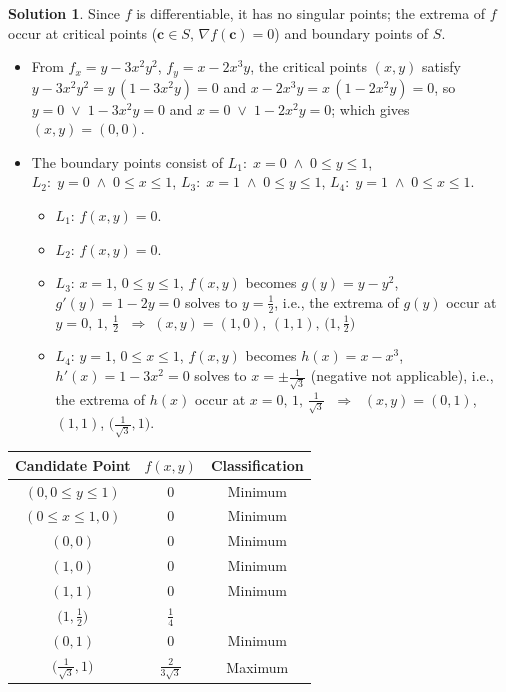 \documentclass[10pt]{extarticle}
\newcommand{\ds}{\displaystyle}
\newcommand{\ie}{\;\Longrightarrow\;}
\newcommand{\orr}{\;\vee\;}
\newcommand{\andd}{\;\wedge\;}
\theoremstyle{definition}
\newtheorem*{sol}{Solution}
\newcommand{\vc}{\mathbf{c}}
\begin{document}
\begin{sol}
  Since $f$ is differentiable, it has no singular points; the extrema of $f$ occur at critical points ($\vc\in S,\,\nabla f(\vc) = 0$) and boundary points of $S$. 
  \begin{itemize}%
    \item From $\ds f_x = y - 3x^2y^2$, $\ds f_y = x - 2x^3y$, the critical points $(x, y)$ satisfy $\ds y - 3x^2y^2 = y\,(1 - 3x^2y) = 0$ and $\ds x - 2x^3y = x\,(1 - 2x^2y)= 0$, so $y = 0\orr 1 - 3x^2y = 0$ and $x = 0\orr 1 - 2x^2y = 0$; which gives $(x, y) = (0, 0)$. 
    \item The boundary points consist of $L_1:\;x = 0\andd 0\leqslant y\leqslant 1$, $L_2:\;y = 0\andd 0\leqslant x\leqslant 1$, $L_3:\;x = 1\andd 0\leqslant y\leqslant 1$, $L_4:\;y = 1\andd 0\leqslant x\leqslant 1$. 
      \begin{itemize}%
        \item $L_1$: $f(x, y) = 0$. 
        \item $L_2$: $f(x, y) = 0$. 
        \item $L_3$: $x = 1$, $0\leqslant y\leqslant1$, $f(x, y)$ becomes $g(y) = y - y^2$, $g'(y) = 1 - 2y = 0$ solves to $y = \frac{1}{2}$, i.e., the extrema of $g(y)$ occur at $y = 0,\,1,\,\frac{1}{2}$ $\ie (x, y) = (1, 0),\,(1, 1),\,\big(1, \frac{1}{2}\big)$ 
        \item $L_4$: $y = 1$, $0\leqslant x\leqslant1$, $f(x, y)$ becomes $h(x) = x - x^3$, $h'(x) = 1 - 3x^2 = 0$ solves to $x = \pm\frac{1}{\sqrt{3}}$ (negative not applicable), i.e., the extrema of $h(x)$ occur at $x = 0,\,1,\,\frac{1}{\sqrt{3}}$ $\ie$ $(x, y) = (0, 1)$, $(1, 1)$, $\big(\frac{1}{\sqrt{3}}, 1\big)$. 
      \end{itemize}
  \end{itemize}
  \begin{center}
  \begin{tabular}{ccc}
    \toprule
    Candidate Point & $f(x, y)$ & Classification \\    
    \midrule
    $(0, 0\leqslant y\leqslant 1)$ & $0$ & Minimum \\
    $(0\leqslant x\leqslant 1, 0)$ & $0$ & Minimum \\
    $(0, 0)$  & $0$ &  Minimum \\ 
    $(1, 0)$  & $0$ &  Minimum \\ 
    $(1, 1)$  & $0$ &  Minimum \\ 
    $\big(1, \frac{1}{2}\big)$  & $\frac{1}{4}$ &  \\ 
    $(0, 1)$  & $0$ &  Minimum \\ 
    $\big(\frac{1}{\sqrt{3}}, 1\big)$  & $\frac{2}{3\sqrt{3}}$ & Maximum \\ 
    \bottomrule
  \end{tabular}
  \end{center}
\end{sol}
\end{document}
